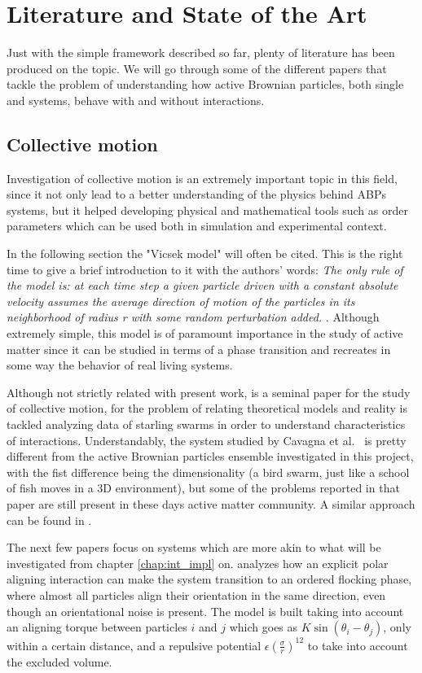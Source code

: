 \documentclass[../../master_thesis_np.tex]{subfiles}
\begin{document}
		\section{Literature and State of the Art}
		
		Just with the simple framework described so far, plenty of literature has been produced on the topic. We will go through some of the  different papers that tackle the problem of understanding how active Brownian particles, both single and systems, behave with and without interactions.
		
		\subsection{Collective motion}
		Investigation of collective motion is an extremely important topic in this field, since it not only lead to a better understanding of the physics behind ABPs systems, but it helped developing physical and mathematical tools such as order parameters which can be used both in simulation and experimental context. 
		
		In the following section the "Vicsek model" will often be cited. This is the right time to give a brief introduction to it with the authors' words: \emph{The only rule of the model is: at each time step a given particle driven with a constant absolute velocity assumes the average direction of motion of the particles in its neighborhood of radius r with some random perturbation added.} \cite{vicsek_novel_1995}. Although extremely simple, this model is of paramount importance in the study of active matter since it can be studied in terms of a phase transition and recreates in some way the behavior of real living systems.
		
		Although not strictly related with present work,\cite{cavagna_empirical_2010} is a seminal paper for the study of collective motion, for the problem of relating theoretical models and reality is tackled analyzing data of starling swarms in order to understand characteristics of interactions. Understandably, the system studied by Cavagna et al.~ is pretty different from the active Brownian particles ensemble investigated in this project, with the fist difference being the dimensionality (a bird swarm, just like a school of fish moves in a 3D environment), but some of the problems reported in that paper are still present in these days active matter community. A similar approach can be found in \cite{ballerini_interaction_2008}.
		
		The next few papers focus on systems which are more akin to what will be investigated from chapter \ref{chap:int_impl} on. \cite{martin-gomez_collective_2018} analyzes how an explicit polar aligning interaction can make the system transition to an ordered flocking phase, where almost all particles align their orientation in the same direction, even though an orientational noise is present. The model is built taking into account an aligning torque between particles $i$ and $j$ which goes as $K \sin{(\theta_{i} - \theta_{j})}$, only within a certain distance, and a repulsive potential $\epsilon \left(\frac{\sigma}{r}\right)^{12}$ to take into account the excluded volume.
		
\end{document}
